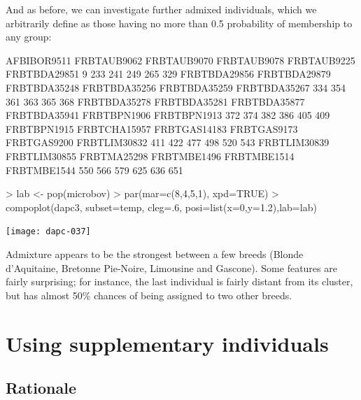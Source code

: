 \documentclass{article}
\begin{document}
And as before, we can investigate further admixed individuals, which we arbitrarily define as those
having no more than 0.5 probability of membership to any group:
\begin{Schunk}
\begin{Soutput}
 AFBIBOR9511  FRBTAUB9062  FRBTAUB9070  FRBTAUB9078  FRBTAUB9225 FRBTBDA29851 
           9          233          241          249          265          329 
FRBTBDA29856 FRBTBDA29879 FRBTBDA35248 FRBTBDA35256 FRBTBDA35259 FRBTBDA35267 
         334          354          361          363          365          368 
FRBTBDA35278 FRBTBDA35281 FRBTBDA35877 FRBTBDA35941  FRBTBPN1906  FRBTBPN1913 
         372          374          382          386          405          409 
 FRBTBPN1915 FRBTCHA15957 FRBTGAS14183  FRBTGAS9173  FRBTGAS9200 FRBTLIM30832 
         411          422          477          498          520          543 
FRBTLIM30839 FRBTLIM30855  FRBTMA25298  FRBTMBE1496  FRBTMBE1514  FRBTMBE1544 
         550          566          579          625          636          651 
\end{Soutput}
\begin{Sinput}
> lab <- pop(microbov)
> par(mar=c(8,4,5,1), xpd=TRUE)
> compoplot(dapc3, subset=temp, cleg=.6, posi=list(x=0,y=1.2),lab=lab)
\end{Sinput}
\end{Schunk}
\texttt{[image: dapc-037]}

\noindent Admixture appears to be the strongest between a few breeds (Blonde d'Aquitaine, Bretonne Pie-Noire,
Limousine and Gascone). Some features are fairly surprising; for instance, the last individual is
fairly distant from its cluster, but has almost 50\% chances of being assigned to two other breeds.






\section{Using supplementary individuals}

\subsection{Rationale}
\end{document}
